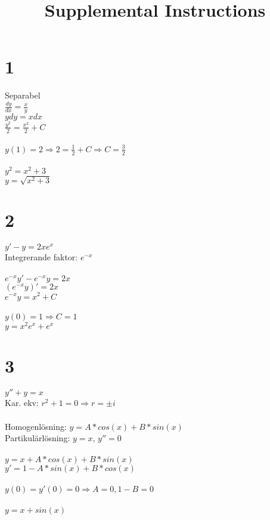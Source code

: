 \documentclass{article}
\title{Supplemental Instructions}
\date{
     }
\begin{document}
\maketitle


\section*{1}
Separabel\\
$\frac{dy}{dx} = \frac{x}{y}$\\
$y dy = x dx$\\
$\frac{y^2}{2} = \frac{x^2}{2} + C$\\\\
$y(1) = 2 \Rightarrow 2 = \frac{1}{2} + C \Rightarrow C = \frac{3}{2}$\\\\
$y^2 = x^2+3$\\
$y = \sqrt{x^2+3}$\\

\section*{2}
$y' - y = 2xe^x$\\
Integrerande faktor: $e^{-x}$\\\\
$e^{-x}y' - e^{-x}y=2x$\\
$(e^{-x}y)' = 2x$\\
$e^{-x}y = x^2+C$\\\\
$y(0) = 1 \Rightarrow C = 1$\\
$y = x^2e^x+e^x$\\

\section*{3}
$y''+y = x$\\
Kar. ekv: $r^2+1 = 0 \Rightarrow r = \pm i$\\\\
Homogenlösning: $y = A*cos(x) + B*sin(x)$\\
Partikulärlösning: $y = x$, $y''=0$\\\\
$y = x + A*cos(x) + B*sin(x)$\\
$y' = 1 - A*sin(x) + B*cos(x)$\\\\
$y(0) = y'(0) = 0 \Rightarrow A = 0, 1-B = 0$\\\\
$y = x + sin(x)$\\
\end{document}
